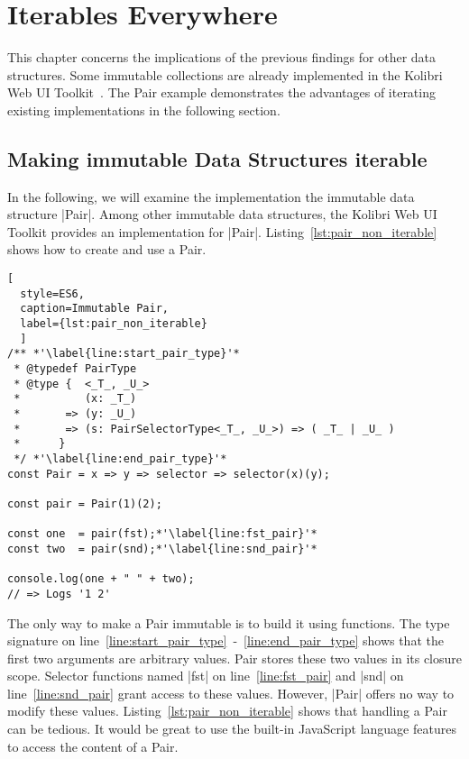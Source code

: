 \section{Iterables Everywhere}
\label{sec:Iterables Everywhere}
This chapter concerns the implications of the previous findings for other
data structures.
Some immutable collections are already implemented in the Kolibri Web UI
Toolkit~\cite{kolibri}. The Pair example demonstrates the advantages of 
iterating existing implementations in the following section.

\subsection{Making immutable Data Structures iterable}
\label{sub:Making immutable Data Structures iterable}
In the following, we will examine the implementation the immutable data structure |Pair|. 
Among other immutable data structures, the Kolibri Web UI Toolkit provides an
implementation for |Pair|. 
Listing~\ref{lst:pair_non_iterable} shows how to create and use a Pair.

\begin{lstlisting}[
  style=ES6, 
  caption=Immutable Pair,
  label={lst:pair_non_iterable}
  ]
/** *'\label{line:start_pair_type}'*
 * @typedef PairType
 * @type {  <_T_, _U_>
 *          (x: _T_)
 *       => (y: _U_)
 *       => (s: PairSelectorType<_T_, _U_>) => ( _T_ | _U_ ) 
 *      }
 */ *'\label{line:end_pair_type}'*
const Pair = x => y => selector => selector(x)(y);

const pair = Pair(1)(2);

const one  = pair(fst);*'\label{line:fst_pair}'*
const two  = pair(snd);*'\label{line:snd_pair}'*

console.log(one + " " + two);
// => Logs '1 2'
\end{lstlisting}

The only way to make a Pair immutable is to build it using functions. The type 
signature on line~\ref{line:start_pair_type}~-~\ref{line:end_pair_type} shows 
that the first two arguments are arbitrary values. Pair stores these two values
in its closure scope. 
Selector functions named |fst| on line~\ref{line:fst_pair} and |snd| on 
line~\ref{line:snd_pair} grant access to these values. However, |Pair| offers
no way to modify these values. Listing~\ref{lst:pair_non_iterable} shows that handling a Pair can be tedious. 
It would be great to use the built-in JavaScript language features to access 
the content of a Pair. 

